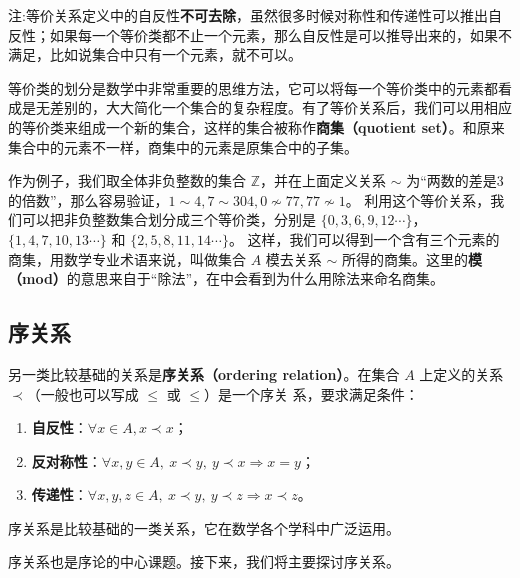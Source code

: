 注:等价关系定义中的自反性\textbf{不可去除}，虽然很多时候对称性和传递性可以推出自反性；如果每一个等价类都不止一个元素，那么自反性是可以推导出来的，如果不满足，比如说集合中只有一个元素，就不可以。

等价类的划分是数学中非常重要的思维方法，它可以将每一个等价类中的元素都看成是无差别的，大大简化一个集合的复杂程度。有了等价关系后，我们可以用相应的等价类来组成一个新的集合，这样的集合被称作\textbf{商集（quotient set）}。和原来集合中的元素不一样，商集中的元素是原集合中的子集。

作为例子，我们取全体非负整数的集合 $\mathbb{Z}$，并在上面定义关系 $\sim$ 为“两数的差是3的倍数”，那么容易验证，$1\sim4, 7\sim304, 0\not\sim 77, 77\not\sim 1$。 利用这个等价关系，我们可以把非负整数集合划分成三个等价类，分别是 $\{0, 3, 6, 9, 12\cdots \}$，$\{1, 4, 7, 10, 13\cdots\}$ 和 $\{2, 5, 8, 11, 14\cdots\}$。 这样，我们可以得到一个含有三个元素的商集，用数学专业术语来说，叫做集合 $A$ 模去关系 $\sim$ 所得的商集。这里的\textbf{模（mod）}的意思来自于“除法”，在中会看到为什么用除法来命名商集。

\subsection{序关系}\label{sub_Relat_2}

另一类比较基础的关系是\textbf{序关系（ordering relation）}。在集合 $A$ 上定义的关系 $\prec$（一般也可以写成 $\leq$ 或 $\leqslant$）是一个序关
系，要求满足条件：
\begin{enumerate}
\item \textbf{自反性}：$\forall x\in A,x\prec x$；
\item \textbf{反对称性}：$\forall x,y\in A,\ x\prec y,\ y\prec x \Rightarrow x = y $；
\item \textbf{传递性}：$\forall x,y,z\in A,\ x\prec y,\ y\prec z \Rightarrow x\prec z $。
\end{enumerate}

序关系是比较基础的一类关系，它在数学各个学科中广泛运用。

序关系也是序论的中心课题。接下来，我们将主要探讨序关系。
